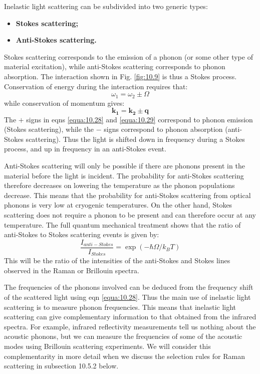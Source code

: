 \documentclass[12pt]{book}
\begin{document}
{Inelastic light scattering can be subdivided into two generic types:
\begin{itemize}
  \item \textbf{Stokes scattering;}
  \item \textbf{Anti-Stokes scattering.}
\end{itemize}
Stokes scattering corresponds to the emission of a phonon (or some other type of material excitation), while anti-Stokes scattering corresponds to phonon absorption. The interaction shown in Fig. \ref{fig:10.9} is thus a Stokes process. Conservation of energy during the interaction requires that:
\begin{equation}\label{equa:10.28}
  \omega_1=\omega_2\pm\Omega
\end{equation}
while conservation of momentum gives:
\begin{equation}\label{equa:10.29}
  \mathbf{k_1}=\mathbf{k_2}\pm\mathbf{q}
\end{equation}
The $+$ signs in eqns \ref{equa:10.28} and \ref{equa:10.29} correspond to phonon emission (Stokes scattering), while the $-$ signs correspond to phonon absorption (anti-Stokes scattering). Thus the light is shifted down in frequency during a Stokes process, and up in frequency in an anti-Stokes event.

Anti-Stokes scattering will only be possible if there are phonons present in the material before the light is incident. The probability for anti-Stokes scattering therefore decreases on lowering the temperature as the phonon populations decrease. This means that the probability for anti-Stokes scattering from optical phonons is very low at cryogenic temperatures. On the other hand, Stokes scattering does not require a phonon to be present and can therefore occur at any temperature. The full quantum mechanical treatment shows that the ratio of anti-Stokes to Stokes scattering events is given by:
\begin{equation}\label{equa:10.30}
  \frac{I_{anti-Stokes}}{I_{Stokes}}=\exp(-\hbar\Omega/k_BT)
\end{equation}
This will be the ratio of the intensities of the anti-Stokes and Stokes lines observed in the Raman or Brillouin spectra.

The frequencies of the phonons involved can be deduced from the frequency shift of the scattered light using eqn \ref{equa:10.28}. Thus the main use of inelastic light scattering is to measure phonon frequencies. This means that inelastic light scattering can give complementary information to that obtained from the infrared spectra. For example, infrared reflectivity measurements tell us nothing about the acoustic phonons, but we can measure the frequencies of some of the acoustic modes using Brillouin scattering experiments. We will consider this complementarity in more detail when we discuss the selection rules for Raman scattering in subsection 10.5.2 below.

}
\end{document}

